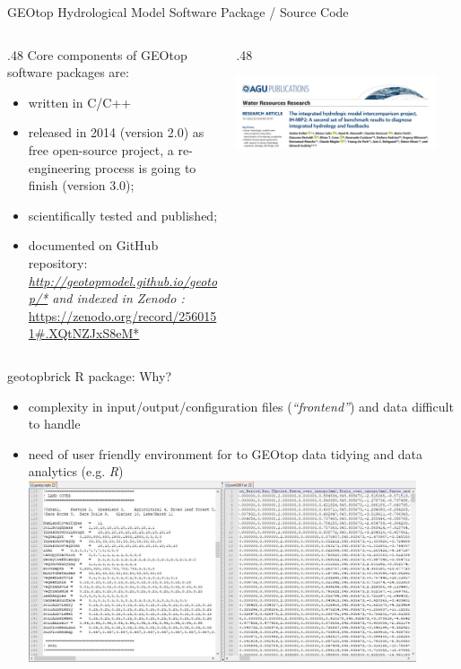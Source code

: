 \documentclass[ignorenonframetext,]{beamer}
\providecommand{\tightlist}{%
  \setlength{\itemsep}{0pt}\setlength{\parskip}{0pt}}
\def\begincols{\begin{columns}}
\def\begincol{\begin{column}}
\def\endcol{\end{column}}
\def\endcols{\end{columns}}
\begin{document}
\begin{frame}{GEOtop Hydrological Model Software Package / Source Code}

\begincols

\begincol{.48\textwidth} Core components of GEOtop software packages
are:

\begin{itemize}
\tightlist
\item
  written in C/C++
\item
  released in 2014 (version 2.0) as free open-source project, a
  re-engineering process is going to finish (version 3.0);
\item
  scientifically tested and published;
\item
  documented on GitHub repository:
  \emph{\url{http://geotopmodel.github.io/geotop/*} and indexed in
  Zenodo : }\url{https://zenodo.org/record/2560151\#.XQtNZJxS8eM*}
\end{itemize}

\endcol

\begincol{.48\textwidth}

\includegraphics[width=0.90000\textwidth]{resources/images/geotop_paper_2017.png}\\
\endcol

\endcols

\end{frame}

\begin{frame}{geotopbrick R package: Why?}

\begin{itemize}
\tightlist
\item
  complexity in input/output/configuration files (\emph{``frontend''})
  and data difficult to handle
\item
  need of user friendly environment for to GEOtop data tidying and data
  analytics (e.g. \emph{R})
  \includegraphics[width=0.90000\textwidth]{resources/images/Capture_IO_GEOtopJPG.JPG}\\
\end{itemize}

\end{frame}
\end{document}
